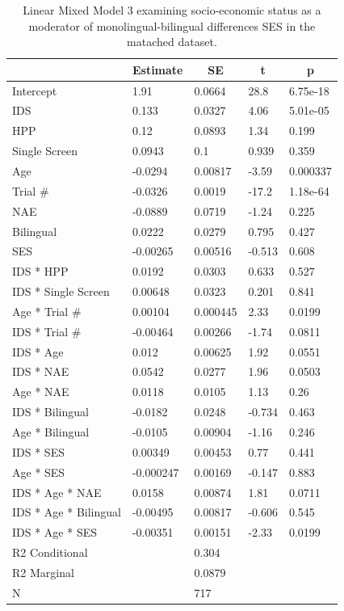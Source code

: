 \documentclass[,man,floatsintext]{apa6}
\begin{document}
\begin{table}[tbp]
\begin{center}
\begin{threeparttable}
\caption{\label{tab:unnamed-chunk-14}Linear Mixed Model 3 examining socio-economic status as a moderator of monolingual-bilingual differences SES in the matached dataset.}
\begin{tabular}{lllll}
\toprule
 & \multicolumn{1}{c}{Estimate} & \multicolumn{1}{c}{SE} & \multicolumn{1}{c}{t} & \multicolumn{1}{c}{p}\\
\midrule
Intercept & 1.91 & 0.0664 & 28.8 & 6.75e-18\\
IDS & 0.133 & 0.0327 & 4.06 & 5.01e-05\\
HPP & 0.12 & 0.0893 & 1.34 & 0.199\\
Single Screen & 0.0943 & 0.1 & 0.939 & 0.359\\
Age & -0.0294 & 0.00817 & -3.59 & 0.000337\\
Trial \# & -0.0326 & 0.0019 & -17.2 & 1.18e-64\\
NAE & -0.0889 & 0.0719 & -1.24 & 0.225\\
Bilingual & 0.0222 & 0.0279 & 0.795 & 0.427\\
SES & -0.00265 & 0.00516 & -0.513 & 0.608\\
IDS * HPP & 0.0192 & 0.0303 & 0.633 & 0.527\\
IDS * Single Screen & 0.00648 & 0.0323 & 0.201 & 0.841\\
Age * Trial \# & 0.00104 & 0.000445 & 2.33 & 0.0199\\
IDS * Trial \# & -0.00464 & 0.00266 & -1.74 & 0.0811\\
IDS * Age & 0.012 & 0.00625 & 1.92 & 0.0551\\
IDS * NAE & 0.0542 & 0.0277 & 1.96 & 0.0503\\
Age * NAE & 0.0118 & 0.0105 & 1.13 & 0.26\\
IDS * Bilingual & -0.0182 & 0.0248 & -0.734 & 0.463\\
Age * Bilingual & -0.0105 & 0.00904 & -1.16 & 0.246\\
IDS * SES & 0.00349 & 0.00453 & 0.77 & 0.441\\
Age * SES & -0.000247 & 0.00169 & -0.147 & 0.883\\
IDS * Age * NAE & 0.0158 & 0.00874 & 1.81 & 0.0711\\
IDS * Age * Bilingual & -0.00495 & 0.00817 & -0.606 & 0.545\\
IDS * Age * SES & -0.00351 & 0.00151 & -2.33 & 0.0199\\ \midrule
R2 Conditional &  & 0.304 &  & \\
R2 Marginal &  & 0.0879 &  & \\ \midrule
N &  & 717 &  & \\
\bottomrule
\end{tabular}
\end{threeparttable}
\end{center}
\end{table}
\end{document}

